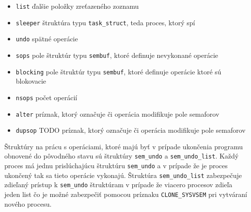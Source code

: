 \begin{itemize}
\item \texttt{list} ďalšie položky zreťazeného zoznamu
\item \texttt{sleeper} štruktúra typu \texttt{task\_struct}, teda proces, ktorý spí
\item \texttt{undo} spätné operácie
\item \texttt{sops} pole štruktúr typu \texttt{sembuf}, ktoré definuje nevykonané operácie
\item \texttt{blocking} pole štruktúr typu \texttt{sembuf}, ktoré definuje operácie ktoré sú blokovacie
\item \texttt{nsops} počet operácií
\item \texttt{alter} príznak, ktorý označuje či operácia modifikuje pole semaforov
\item \texttt{dupsop} TODO príznak, ktorý označuje či operácia modifikuje pole semaforov
\end{itemize}
Štruktúry na prácu s operáciami, ktoré majú byť v prípade ukončenia programu obnovené do pôvodného stavu sú štruktúry \texttt{sem\_undo} a \texttt{sem\_undo\_list}. Každý proces má jednu prislúchajúcu štruktúru \texttt{sem\_undo} a v prípade že je proces ukončený tak sa tieto operácie vykonajú. Štruktúra \texttt{sem\_undo\_list} zabezpečuje zdieľaný prístup k \texttt{sem\_undo} štruktúram v prípade že viacero procesov zdieľa jeden list čo je možné zabezpečiť pomocou príznaku \texttt{CLONE\_SYSVSEM} pri vytváraní nového procesu.\cite{newlinux}
